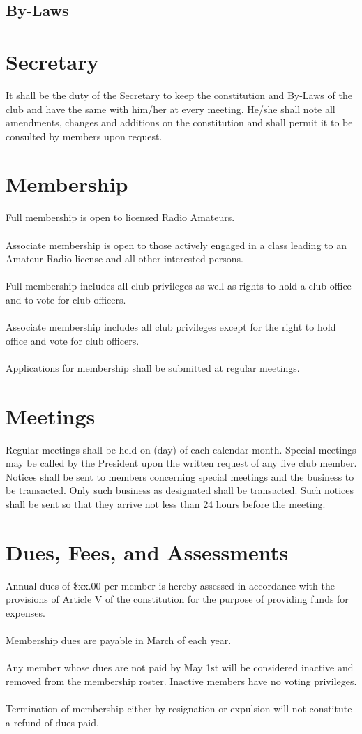 \documentclass[english,12pt,letterpaper]{article}
\author{KC1AWV}
\begin{document}
	\begin{center}
		\section*{By-Laws}
	\end{center}
	\section{Secretary}
	It shall be the duty of the Secretary to keep the constitution and By-Laws of the club and have the same with him/her at every meeting. He/she shall note all amendments, changes and additions on the constitution and shall permit it to be consulted by members upon request.
	\section{Membership}
	Full membership is open to licensed Radio Amateurs. \\
	\\
	Associate membership is open to those actively engaged in a class leading to an Amateur Radio license and all other interested persons. \\
	\\
	Full membership includes all club privileges as well as rights to hold a club office and to vote for club officers. \\
	\\
	Associate membership includes all club privileges except for the right to hold office and vote for club officers. \\
	\\
	Applications for membership shall be submitted at regular meetings.
	\section{Meetings}
	Regular meetings shall be held on (day) of each calendar month. Special meetings may be called by the President upon the written request of any five club member. Notices shall be sent to members concerning special meetings and the business to be transacted. Only such business as designated shall be transacted. Such notices shall be sent so that they arrive not less than 24 hours before the meeting.
	\section{Dues, Fees, and Assessments}
	Annual dues of \$xx.00 per member is hereby assessed in accordance with the provisions of Article V of the constitution for the purpose of providing funds for expenses. \\
	\\
	Membership dues are payable in March of each year. \\
	\\
	Any member whose dues are not paid by May 1st will be considered inactive and removed from the membership roster. Inactive members have no voting privileges. \\
	\\
	Termination of membership either by resignation or expulsion will not constitute a refund of dues paid.
\end{document}
